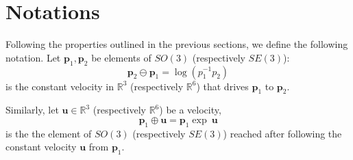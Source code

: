 \documentclass{article}
\newcommand\reals{\mathbb{R}}
\begin{document}
\section{Notations}

Following the properties outlined in the previous sections, we define the
following notation. Let $\mathbf{p}_1, \mathbf{p}_2$ be elements of $SO(3)$
(respectively $SE(3)$):
$$
\mathbf{p}_{2} \ominus \mathbf{p}_{1} = \log(p_{1}^{-1}p_{2})
$$
is the constant velocity in $\reals^3$ (respectively $\reals^6$) that drives
$\mathbf{p}_{1}$ to $\mathbf{p}_{2}$.

Similarly, let $\mathbf{u}\in\reals^3$ (respectively $\reals^6$) be a velocity,
$$
\mathbf{p}_1 \oplus \mathbf{u} = \mathbf{p}_1 \exp\ \mathbf{u}
$$
is the the element of $SO(3)$ (respectively $SE(3)$) reached after following
the constant velocity $\mathbf{u}$ from $\mathbf{p}_1$.
\end{document}
